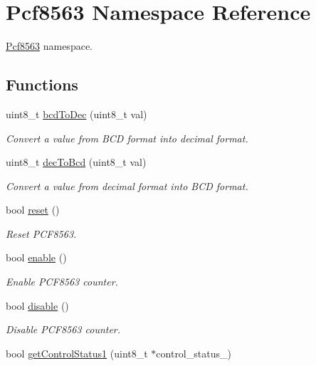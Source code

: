 \hypertarget{namespacePcf8563}{}\section{Pcf8563 Namespace Reference}
\label{namespacePcf8563}


\hyperlink{namespacePcf8563}{Pcf8563} namespace.  


\subsection*{Functions}
\begin{DoxyCompactItemize}
\item 
uint8\+\_\+t \hyperlink{namespacePcf8563_aae506e83df33a718bdd0dd184d42c19a}{bcd\+To\+Dec} (uint8\+\_\+t val)
\begin{DoxyCompactList}\small\item\em Convert a value from B\+CD format into decimal format. \end{DoxyCompactList}\item 
uint8\+\_\+t \hyperlink{namespacePcf8563_a3519616ff3c2de84e2ea54442ef0ed0c}{dec\+To\+Bcd} (uint8\+\_\+t val)
\begin{DoxyCompactList}\small\item\em Convert a value from decimal format into B\+CD format. \end{DoxyCompactList}\item 
bool \hyperlink{namespacePcf8563_abe54082b4f23e40ef4f5be845b5cf008}{reset} ()
\begin{DoxyCompactList}\small\item\em Reset P\+C\+F8563. \end{DoxyCompactList}\item 
bool \hyperlink{namespacePcf8563_a32420d263d406b766b21bc00dccdc333}{enable} ()
\begin{DoxyCompactList}\small\item\em Enable P\+C\+F8563 counter. \end{DoxyCompactList}\item 
bool \hyperlink{namespacePcf8563_a1920171d3aec259327a124b712299a04}{disable} ()
\begin{DoxyCompactList}\small\item\em Disable P\+C\+F8563 counter. \end{DoxyCompactList}\item 
bool \hyperlink{namespacePcf8563_a098f161f3396c8ed0c2f11c7193f5b0d}{get\+Control\+Status1} (uint8\+\_\+t $\ast$control\+\_\+status\+\_)

\end{DoxyCompactItemize}
